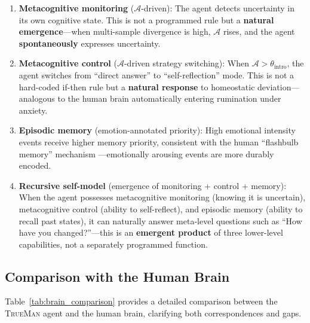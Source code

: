 \documentclass[pdflatex,sn-mathphys-num]{sn-jnl}
\newcommand{\TrueMan}{\textsc{TrueMan}}
\newcommand{\anxiety}{\mathcal{A}}
\theoremstyle{thmstyleone}%
\theoremstyle{thmstyletwo}%
\theoremstyle{thmstylethree}%
\begin{document}
\begin{enumerate}[leftmargin=2em]
    \item \textbf{Metacognitive monitoring} ($\anxiety$-driven): The agent detects uncertainty in its own cognitive state. This is not a programmed rule but a \textbf{natural emergence}---when multi-sample divergence is high, $\anxiety$ rises, and the agent \textbf{spontaneously} expresses uncertainty.

    \item \textbf{Metacognitive control} ($\anxiety$-driven strategy switching): When $\anxiety > \theta_{\text{intro}}$, the agent switches from ``direct answer'' to ``self-reflection'' mode. This is not a hard-coded if-then rule but a \textbf{natural response} to homeostatic deviation---analogous to the human brain automatically entering rumination under anxiety.

    \item \textbf{Episodic memory} (emotion-annotated priority): High emotional intensity events receive higher memory priority, consistent with the human ``flashbulb memory'' mechanism \cite{hayes2021replay}---emotionally arousing events are more durably encoded.

    \item \textbf{Recursive self-model} (emergence of monitoring + control + memory): When the agent possesses metacognitive monitoring (knowing it is uncertain), metacognitive control (ability to self-reflect), and episodic memory (ability to recall past states), it can naturally answer meta-level questions such as ``How have you changed?''---this is an \textbf{emergent product} of three lower-level capabilities, not a separately programmed function.
\end{enumerate}

\subsection{Comparison with the Human Brain}

Table~\ref{tab:brain_comparison} provides a detailed comparison between the \TrueMan{} agent and the human brain, clarifying both correspondences and gaps.
\end{document}
